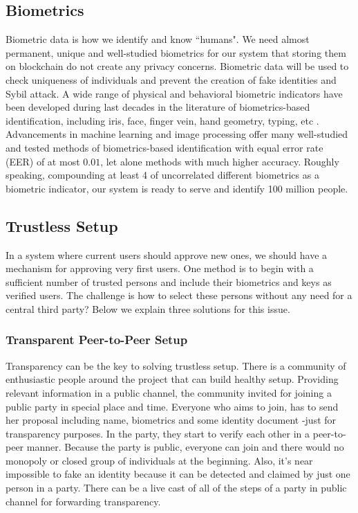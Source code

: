 \documentclass[conference]{IEEEtran}
\begin{document}
\subsection{Biometrics}
Biometric data is how we identify and know ``humans". We need almost permanent, unique and well-studied biometrics for our system that storing them on blockchain do not create any privacy concerns. 
Biometric data will be used to check uniqueness of individuals and prevent the creation of fake identities and Sybil attack. A wide range of physical and behavioral biometric indicators have been developed during last decades in the literature of biometrics-based identification, including iris, face, finger vein, hand geometry, typing, etc \cite{intro-biometic}. Advancements in machine learning and image processing offer many well-studied and tested methods of biometrics-based identification with equal error rate (EER) of at most $0.01$, let alone methods with much higher accuracy. Roughly speaking, compounding at least 4 of uncorrelated different biometrics as a biometric indicator, our system is ready to serve and identify 100 million people.\\

\subsection{Trustless Setup}
In a system where current users should approve new ones, we should have a mechanism for approving very first users. One method is to begin with a sufficient number of trusted persons and include their biometrics and keys as verified users. The challenge is how to select these persons without any need for a central third party? Below we explain three solutions for this issue.

\subsubsection*{Transparent Peer-to-Peer Setup} 
Transparency can be the key to solving trustless setup. There is a community of enthusiastic people around the project that can build healthy setup. Providing relevant information in a public channel, the community invited for joining a public party in special place and time. Everyone who aims to join, has to send her proposal including name, biometrics and some identity document -just for transparency purposes. In the party, they start to verify each other in a peer-to-peer manner. Because the party is public, everyone can join and there would no monopoly or closed group of individuals at the beginning. Also, it's near impossible to fake an identity because it can be detected and claimed by just one person in a party. There can be a live cast of all of the steps of a party in public channel for forwarding transparency.
\end{document}
